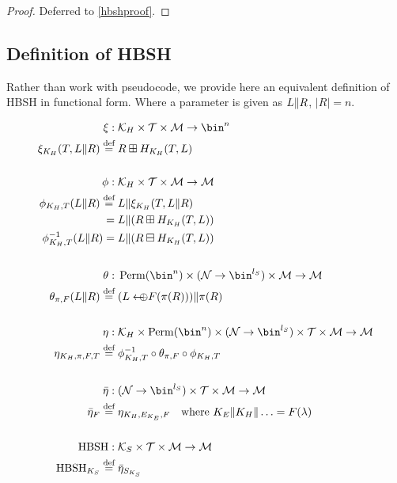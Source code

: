 \documentclass[eprint.tex]{subfiles}
\begin{document}
\begin{proof}Deferred to \autoref{hbshproof}.\renewcommand{\qedsymbol}{}
\end{proof}

\subsection{Definition of HBSH}
Rather than work with pseudocode, we provide here an
equivalent definition of HBSH in functional form.
Where a parameter is given as $L \Vert R$, $|R|=n$.

\begin{align*}
    \xi :{}& \mathcal{K}_H \times \mathcal{T} \times \mathcal{M} \rightarrow \bin^n \\
    \xi_{K_H}(T, L \Concat R) \defeq{}& R \boxplus H_{K_H}(T, L) \\
    \allowdisplaybreaks[4] \vphantom{|} \\ \allowdisplaybreaks[0]
    \phi :{}& \mathcal{K}_H \times \mathcal{T} \times \mathcal{M} \rightarrow \mathcal{M} \\
    \phi_{K_H, T}(L \Concat R) \defeq{}& L \Concat \xi_{K_H}(T, L \Concat R) \\
    ={}& L \Concat (R \boxplus H_{K_H}(T, L)) \\
    \phi^{-1}_{K_H, T}(L \Concat R) ={}& L \Concat (R \boxminus H_{K_H}(T, L)) \\
    \allowdisplaybreaks[4] \vphantom{|} \\ \allowdisplaybreaks[0]
    \theta :{}& \Perm(\bin^n) \times (\mathcal{N} \rightarrow \bin^{l_S}) \times \mathcal{M} \rightarrow \mathcal{M} \\
    \theta_{\pi, F}(L \Concat R) \defeq{}& (L \arrowoplus F(\pi(R))) \Concat \pi(R) \\
    \allowdisplaybreaks[4] \vphantom{|} \\ \allowdisplaybreaks[0]
    \eta :{}& \mathcal{K}_H \times \Perm(\bin^n) \times (\mathcal{N} \rightarrow \bin^{l_S}) \times \mathcal{T} \times \mathcal{M} \rightarrow \mathcal{M} \\
    \eta_{K_H, \pi, F, T} \defeq{}& \phi_{K_H,T}^{-1} \circ \theta_{\pi, F} \circ \phi_{K_H,T} \\
    \allowdisplaybreaks[4] \vphantom{|} \\ \allowdisplaybreaks[0]
    \bar{\eta} :{}& (\mathcal{N} \rightarrow \bin^{l_S}) \times \mathcal{T} \times \mathcal{M} \rightarrow \mathcal{M} \\
    \bar{\eta}_{F} \defeq{}& \eta_{K_H, E_{K_E}, F} \quad \textrm{where} \ K_E \Concat K_H \Concat \ldots = F(\lambda) \\
    \allowdisplaybreaks[4] \vphantom{|} \\ \allowdisplaybreaks[0]
    \HBSH :{}& \mathcal{K}_S \times \mathcal{T} \times \mathcal{M} \rightarrow \mathcal{M} \\
    \HBSH_{K_S} \defeq{}& \bar{\eta}_{S_{K_S}} \\
\end{align*}
\end{document}

